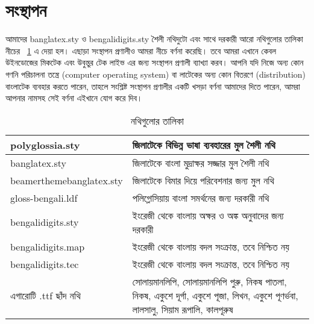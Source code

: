 \documentclass[a4paper,10pt,xetex]{article}
\begin{document}
\section{সংস্থাপন}

আমাদের banglatex.sty ও bengalidigits.sty শৈলী নথিদুটো এবং সাথে দরকারী আরো নথিগুলোর তালিকা নীচের \tablename~\ref{thistable} এ  দেয়া হল। এছাড়া সংস্থাপন প্রণালীও আমরা নীচে বর্ণনা করেছি। তবে আমরা এখানে কেবল উইনডোজের মিকটেক এবং উবুন্তুর টেক লাইভ এর জন্য সংস্থাপন প্রণালী ব্যাখ্যা করব। আপনি যদি নিজে অন্য কোন গণনি পরিচালনা তন্ত্রে (computer operating system) বা লাটেকের অন্য কোন বিতরণে (distribution) বাংলাটেক ব্যবহার করতে পারেন, তাহলে সংশ্লিষ্ট সংস্থাপন প্রণালীর একটি খসড়া বর্ণনা আমাদের দিতে পারেন, আমরা আপনার নামসহ সেই বর্ণনা এইখানে যোগ করে দিব। 

\begin{table}[!hbt]
	\caption{নথিগুলোর তালিকা\label{thistable}}
	\begin{center}\begin{footnotesize}
	\begin{tabular}{|l|l|}
		\hline
		polyglossia.sty & জিলাটেকে বিভিন্ন ভাষা ব্যবহারের মুল শৈলী নথি‌\\\hline
		banglatex.sty & জিলাটেকে বাংলা মুদ্রাক্ষর সজ্জার মুল শৈলী নথি\\\hline
		{\scriptsize beamerthemebanglatex.sty} & জিলাটেকে বিমার দিয়ে পরিবেশনার জন্য মুল নথি\\\hline 
		gloss-bengali.ldf & পলিগ্লোসিয়ায় বাংলা সমর্থনের জন্য দরকারী নথি\\\hline
		bengalidigits.sty & ইংরেজী থেকে বাংলায় অক্ষর ও অঙ্ক অনুবাদের জন্য দরকারী\\\hline
		bengalidigits.map &	 \begin{minipage}{0.5\textwidth}ইংরেজী থেকে বাংলায় বদল সংক্রান্ত, তবে নিশ্চিত নয়\end{minipage}\\\hline
		bengalidigits.tec & \begin{minipage}{0.5\textwidth}ইংরেজী থেকে বাংলায় বদল সংক্রান্ত, তবে নিশ্চিত নয়\end{minipage}\\\hline
               	এগারোটি .ttf ছাঁদ নথি & \begin{minipage}{0.5\textwidth}সোলায়মানলিপি, সোলায়মানলিপি পুরু, নিকষ পাতলা, নিকষ, একুশে দূর্গা, একুশে পূজা, লিখন, একুশে পূণর্ভবা, লালসালু, সিয়াম রূপালি, কালপূরুষ\end{minipage}\\\hline
	\end{tabular}
	\end{footnotesize}\end{center}
\end{table}
\end{document}
